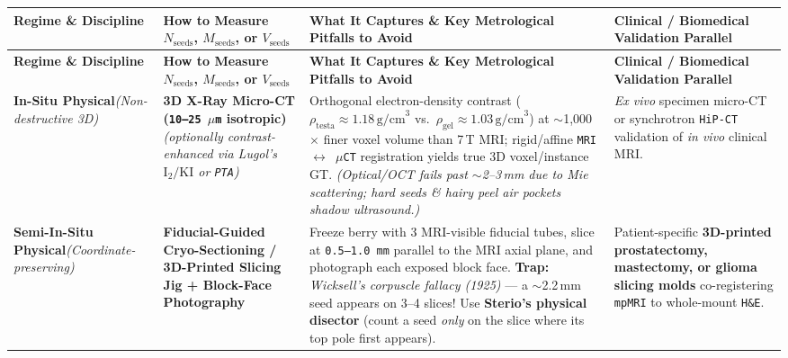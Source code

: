 \documentclass[10pt,a4paper]{article}
\begin{document}
{\footnotesize
\renewcommand{\arraystretch}{1.26}
\begin{xltabular}{\textwidth}{L{2.55cm} L{4.25cm} Y L{3.35cm}}
\toprule
{}\textbf{Regime \& Discipline} & \textbf{How to Measure $N_{\text{seeds}}$, $M_{\text{seeds}}$, or $V_{\text{seeds}}$} & \textbf{What It Captures \& Key Metrological Pitfalls to Avoid} & \textbf{Clinical / Biomedical Validation Parallel} \\
\midrule
\endfirsthead
\toprule
{}\textbf{Regime \& Discipline} & \textbf{How to Measure $N_{\text{seeds}}$, $M_{\text{seeds}}$, or $V_{\text{seeds}}$} & \textbf{What It Captures \& Key Metrological Pitfalls to Avoid} & \textbf{Clinical / Biomedical Validation Parallel} \\
\midrule
\endhead
\bottomrule
\endfoot
\textbf{In-Situ Physical}\newline \textit{(Non-destructive 3D)} &
\textbf{3D X-Ray Micro-CT (\texttt{10--25\,$\mu$m} isotropic)} \textit{(optionally contrast-enhanced via Lugol's $\text{I}_2/\text{KI}$ or \texttt{PTA})} &
Orthogonal electron-density contrast ($\rho_{\text{testa}} \approx 1.18\,\text{g/cm}^3$ vs.\ $\rho_{\text{gel}} \approx 1.03\,\text{g/cm}^3$) at $\sim$1,000$\times$ finer voxel volume than 7\,T MRI; rigid/affine \texttt{MRI $\leftrightarrow$ $\mu$CT} registration yields true 3D voxel/instance GT. \textit{(Optical/OCT fails past $\sim$2--3\,mm due to Mie scattering; hard seeds \& hairy peel air pockets shadow ultrasound.)} &
\textit{Ex vivo} specimen micro-CT or synchrotron \texttt{HiP-CT} validation of \textit{in vivo} clinical MRI. \\

\textbf{Semi-In-Situ Physical}\newline \textit{(Coordinate-preserving)} &
\textbf{Fiducial-Guided Cryo-Sectioning / 3D-Printed Slicing Jig + Block-Face Photography} &
Freeze berry with 3 MRI-visible fiducial tubes, slice at \texttt{0.5--1.0\,mm} parallel to the MRI axial plane, and photograph each exposed block face. \textbf{Trap:} \textit{Wicksell's corpuscle fallacy (1925)} --- a $\sim$2.2\,mm seed appears on 3--4 slices! Use \textbf{Sterio's physical disector} (count a seed \textit{only} on the slice where its top pole first appears). &
Patient-specific \textbf{3D-printed prostatectomy, mastectomy, or glioma slicing molds} co-registering \texttt{mpMRI} to whole-mount \texttt{H\&E}. \\


\end{xltabular}}
\end{document}
